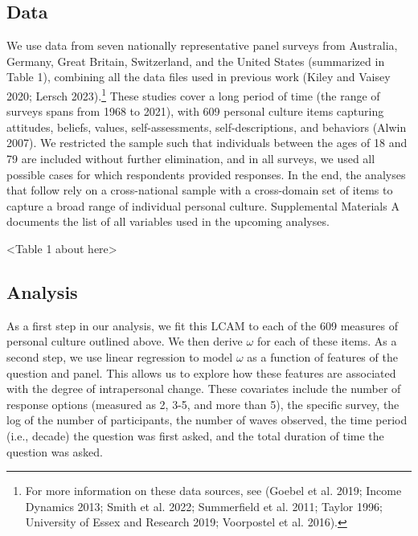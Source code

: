\documentclass[
  12pt,
]{article}
\begin{document}
\hypertarget{data}{%
\subsection{Data}\label{data}}

We use data from seven nationally representative panel surveys from
Australia, Germany, Great Britain, Switzerland, and the United States
(summarized in Table 1), combining all the data files used in previous
work (Kiley and Vaisey 2020; Lersch 2023).\footnote{For more information
  on these data sources, see (Goebel et al. 2019; Income Dynamics 2013;
  Smith et al. 2022; Summerfield et al. 2011; Taylor 1996; University of
  Essex and Research 2019; Voorpostel et al. 2016).} These studies cover
a long period of time (the range of surveys spans from 1968 to 2021),
with 609 personal culture items capturing attitudes, beliefs, values,
self-assessments, self-descriptions, and behaviors (Alwin 2007). We
restricted the sample such that individuals between the ages of 18 and
79 are included without further elimination, and in all surveys, we used
all possible cases for which respondents provided responses. In the end,
the analyses that follow rely on a cross-national sample with a
cross-domain set of items to capture a broad range of individual
personal culture. Supplemental Materials A documents the list of all
variables used in the upcoming analyses.

\begin{center}
<Table 1 about here>
\end{center}

\hypertarget{analysis}{%
\subsection{Analysis}\label{analysis}}

As a first step in our analysis, we fit this LCAM to each of the 609
measures of personal culture outlined above. We then derive \(\omega\)
for each of these items. As a second step, we use linear regression to
model \(\omega\) as a function of features of the question and panel.
This allows us to explore how these features are associated with the
degree of intrapersonal change. These covariates include the number of
response options (measured as 2, 3-5, and more than 5), the specific
survey, the log of the number of participants, the number of waves
observed, the time period (i.e., decade) the question was first asked,
and the total duration of time the question was asked.
\end{document}
